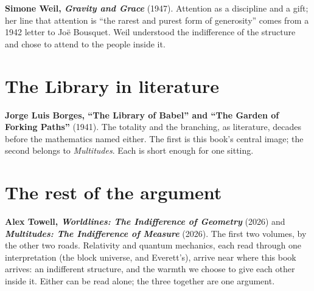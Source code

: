 \textbf{Simone Weil, \textit{Gravity and Grace}} (1947). Attention as a discipline and a gift; her line that attention is ``the rarest and purest form of generosity'' comes from a 1942 letter to Jo\"e Bousquet. Weil understood the indifference of the structure and chose to attend to the people inside it.

\section*{The Library in literature}

\textbf{Jorge Luis Borges, ``The Library of Babel'' and ``The Garden of Forking Paths''} (1941). The totality and the branching, as literature, decades before the mathematics named either. The first is this book's central image; the second belongs to \textit{Multitudes}. Each is short enough for one sitting.

\section*{The rest of the argument}

\textbf{Alex Towell, \textit{Worldlines: The Indifference of Geometry}} (2026) and \textbf{\textit{Multitudes: The Indifference of Measure}} (2026). The first two volumes, by the other two roads. Relativity and quantum mechanics, each read through one interpretation (the block universe, and Everett's), arrive near where this book arrives: an indifferent structure, and the warmth we choose to give each other inside it. Either can be read alone; the three together are one argument.
